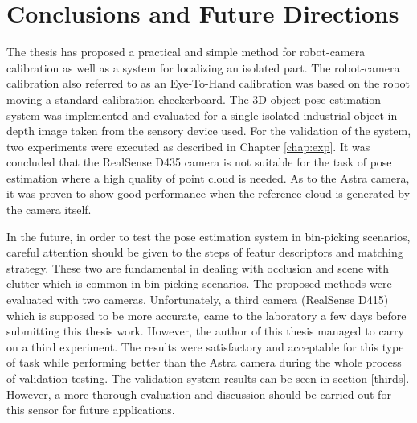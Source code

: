 \chapter{Conclusions and Future Directions}
\label{chap:con}

The thesis has proposed a practical and simple method for robot-camera calibration as well as a system for localizing an isolated part. The robot-camera calibration also referred to as an Eye-To-Hand calibration was based on the robot moving a standard calibration checkerboard. The 3D object pose estimation system was implemented and evaluated for a single isolated industrial object in depth image taken from the sensory device used. For the validation of the system, two experiments were executed as described in Chapter \ref{chap:exp}. It was concluded that the RealSense D435 camera is not suitable for the task of pose estimation where a high quality of point cloud is needed. As to the Astra camera, it was proven to show good performance when the reference cloud is generated by the camera itself.

In the future, in order to test the pose estimation system in bin-picking scenarios, careful attention should be given to the steps of featur descriptors and matching strategy. These two are fundamental in dealing with occlusion and scene with clutter which is common in bin-picking scenarios. The proposed methods were evaluated with two cameras. Unfortunately, a third camera (RealSense D415) which is supposed to be more accurate, came to the laboratory a few days before submitting this thesis work. However, the author of this thesis managed to carry on a third experiment. The results were satisfactory and acceptable for this type of task while performing better than the Astra camera during the whole process of validation testing. The validation system results can be seen in section \ref{thirds}. However, a more thorough evaluation and discussion should be carried out for this sensor for future applications.  




